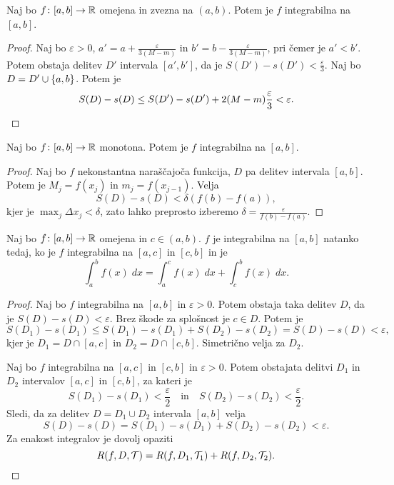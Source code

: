 \documentclass[12pt, a4paper]{article}
\begin{document}
\begin{trditev}
Naj bo $f\colon[a,b]\to\mathbb{R}$ omejena in zvezna na $(a,b)$. Potem je $f$ integrabilna na $[a,b]$.
\end{trditev}

\begin{proof}
Naj bo $\varepsilon>0$, $a'=a+\frac{\varepsilon}{3(M-m)}$ in $b'=b-\frac{\varepsilon}{3(M-m)}$, pri čemer je $a'<b'$. Potem obstaja delitev $D'$ intervala $[a',b']$, da je $S(D')-s(D')<\frac{\varepsilon}{3}$. Naj bo $D=D'\cup\left\{a,b\right\}$. Potem je
\[
S(D)-s(D)\leq S(D')-s(D')+2(M-m)\frac{\varepsilon}{3}<\varepsilon.\qedhere
\]
\end{proof}

\begin{izrek}
Naj bo $f\colon[a,b]\to\mathbb{R}$ monotona. Potem je $f$ integrabilna na $[a,b]$.
\end{izrek}

\begin{proof}
Naj bo $f$ nekonstantna naraščajoča funkcija, $D$ pa delitev intervala $[a,b]$. Potem je $M_j=f(x_j)$ in $m_j=f(x_{j-1})$. Velja
\[
S(D)-s(D)<\delta(f(b)-f(a)),
\]
kjer je $\displaystyle\max_j\Delta x_j<\delta$, zato lahko preprosto izberemo $\delta=\frac{\varepsilon}{f(b)-f(a)}$.
\end{proof}

\begin{trditev}
Naj bo $f\colon[a,b]\to\mathbb{R}$ omejena in $c\in(a,b)$. $f$ je integrabilna na $[a,b]$ natanko tedaj, ko je $f$ integrabilna na $[a,c]$ in $[c,b]$ in je
\[
\int_a^b f(x)\;dx=\int_a^c f(x)\;dx+\int_c^b f(x)\;dx.
\]
\end{trditev}

\begin{proof}
Naj bo $f$ integrabilna na $[a,b]$ in $\varepsilon>0$. Potem obstaja taka delitev $D$, da je $S(D)-s(D)<\varepsilon$. Brez škode za splošnost je $c\in D$. Potem je
\[
S(D_1)-s(D_1)\leq S(D_1)-s(D_1)+S(D_2)-s(D_2)=S(D)-s(D)<\varepsilon,
\]
kjer je $D_1=D\cap[a,c]$ in $D_2=D\cap[c,b]$. Simetrično velja za $D_2$.

Naj bo $f$ integrabilna na $[a,c]$ in $[c,b]$ in $\varepsilon>0$. Potem obstajata delitvi $D_1$ in $D_2$ intervalov $[a,c]$ in $[c,b]$, za kateri je
\[
S(D_1)-s(D_1)<\frac{\varepsilon}{2}\quad\text{in}\quad S(D_2)-s(D_2)<\frac{\varepsilon}{2}.
\]
Sledi, da za delitev $D=D_1\cup D_2$ intervala $[a,b]$ velja
\[
S(D)-s(D)=S(D_1)-s(D_1)+S(D_2)-s(D_2)<\varepsilon.
\]
Za enakost integralov je dovolj opaziti
\[
R(f,D,\mathcal{T})=R(f,D_1,\mathcal{T}_1)+R(f,D_2,\mathcal{T}_2).\qedhere
\]
\end{proof}
\end{document}

